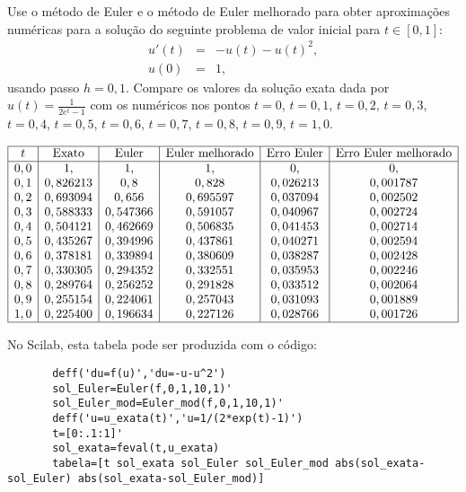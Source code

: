 \begin{exer}
Use o método de Euler e o método de Euler melhorado para obter aproximações numéricas para a solução do seguinte problema de valor inicial para $t\in[0,1]$:
\begin{eqnarray*}
 u'(t)&=&-u(t)- u(t)^2,\\
 u(0)&=&1,
\end{eqnarray*}
usando passo $h=0,1$. Compare os valores da solução exata dada por $u(t)=\frac{1}{2e^t-1}$ com os numéricos nos pontos $t=0$, $t=0,1$, $t=0,2$, $t=0,3$, $t=0,4$, $t=0,5$, $t=0,6$, $t=0,7$, $t=0,8$, $t=0,9$, $t=1,0$.
\end{exer}
\begin{resp}
 $$\begin{array}{|c|c|c|c|c|c|}
\hline
t &  \text{Exato} & \text{Euler} & \text{Euler melhorado} & \text{Erro Euler} & \text{Erro Euler melhorado}\\
\hline
0,0&    1,          &1,          &1,          &0,          &0,       \\
0,1&    0,826213    &0,8         &0,828       &0,026213    &0,001787\\
0,2&    0,693094    &0,656       &0,695597    &0,037094    &0,002502  \\
0,3&    0,588333    &0,547366    &0,591057    &0,040967    &0,002724  \\
0,4&    0,504121    &0,462669    &0,506835    &0,041453    &0,002714  \\
0,5&    0,435267    &0,394996    &0,437861    &0,040271    &0,002594  \\
0,6&    0,378181    &0,339894    &0,380609    &0,038287    &0,002428  \\
0,7&    0,330305    &0,294352    &0,332551    &0,035953    &0,002246  \\
0,8&    0,289764    &0,256252    &0,291828    &0,033512    &0,002064  \\
0,9&    0,255154    &0,224061    &0,257043    &0,031093    &0,001889  \\
1,0&    0,225400    &0,196634    &0,227126    &0,028766    &0,001726\\

\hline
\end{array}
$$

\ifisscilab
      No Scilab, esta tabela pode ser produzida com o código:
      \begin{verbatim}
       deff('du=f(u)','du=-u-u^2')
       sol_Euler=Euler(f,0,1,10,1)'
       sol_Euler_mod=Euler_mod(f,0,1,10,1)'
       deff('u=u_exata(t)','u=1/(2*exp(t)-1)')
       t=[0:.1:1]'
       sol_exata=feval(t,u_exata)
       tabela=[t sol_exata sol_Euler sol_Euler_mod abs(sol_exata-sol_Euler) abs(sol_exata-sol_Euler_mod)]
      \end{verbatim}

    \fi
\end{resp}


